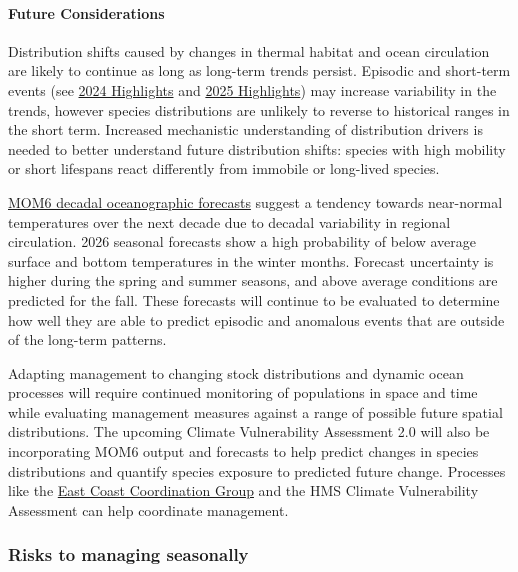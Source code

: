 \documentclass[
  10pt,
]{article}
\begin{document}
\paragraph{Future Considerations}\label{future-considerations}

Distribution shifts caused by changes in thermal habitat and ocean circulation are likely to continue as long as long-term trends persist. Episodic and short-term events (see \href{https://noaa-edab.github.io/catalog/observation_synthesis_2024.html}{2024 Highlights} and \hyperref[highlights]{2025 Highlights}) may increase variability in the trends, however species distributions are unlikely to reverse to historical ranges in the short term. Increased mechanistic understanding of distribution drivers is needed to better understand future distribution shifts: species with high mobility or short lifespans react differently from immobile or long-lived species.

\href{https://noaa-edab.github.io/catalog/MOM6_forecasts.html}{MOM6 decadal oceanographic forecasts} suggest a tendency towards near-normal temperatures over the next decade due to decadal variability in regional circulation. 2026 seasonal forecasts show a high probability of below average surface and bottom temperatures in the winter months. Forecast uncertainty is higher during the spring and summer seasons, and above average conditions are predicted for the fall. These forecasts will continue to be evaluated to determine how well they are able to predict episodic and anomalous events that are outside of the long-term patterns.

Adapting management to changing stock distributions and dynamic ocean processes will require continued monitoring of populations in space and time while evaluating management measures against a range of possible future spatial distributions. The upcoming Climate Vulnerability Assessment 2.0 will also be incorporating MOM6 output and forecasts to help predict changes in species distributions and quantify species exposure to predicted future change. Processes like the \href{https://www.mafmc.org/e3cg}{East Coast Coordination Group} and the HMS Climate Vulnerability Assessment can help coordinate management.

\newpage

\subsubsection{Risks to managing seasonally}\label{risks-to-managing-seasonally}
\end{document}
